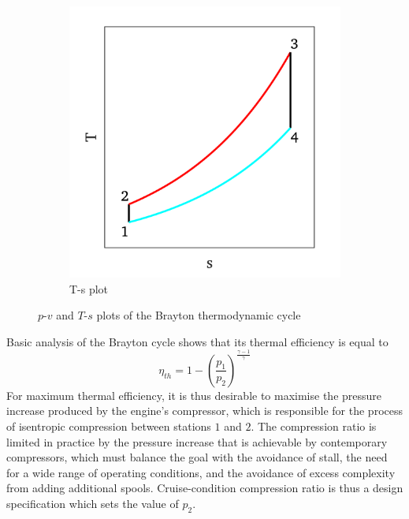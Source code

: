 \documentclass[a4paper, 11pt, oneside]{report}
\begin{document}
\begin{figure}[H]
\begin{subfigure}{.45\textwidth}
		\includegraphics[width=\linewidth]{figs/brayton_cycle_ts_plot.png}
		\caption{T-s plot}
		\label{fig:brayton_cycle_ts_plot}
	\end{subfigure}
	\caption{$p$-$v$ and $T$-$s$ plots of the Brayton thermodynamic cycle}
	\label{fig:brayton_cycle_plots}
\end{figure}

Basic analysis of the Brayton cycle shows that its thermal efficiency is equal to
\begin{equation}
	\eta_{th} = 
	1 - 
	\left(
		\frac{p_{1}}{p_{2}}
	\right)
	^
	\frac{\gamma-1}{\gamma}
\end{equation}
For maximum thermal efficiency, it is thus desirable to maximise the pressure increase produced by the engine's compressor, which is responsible for the process of isentropic compression between stations $1$ and $2$. The compression ratio is limited in practice by the pressure increase that is achievable by contemporary compressors, which must balance the goal with the avoidance of stall, the need for a wide range of operating conditions, and the avoidance of excess complexity from adding additional spools. Cruise-condition compression ratio is thus a design specification which sets the value of $p_2$.
\end{document}
